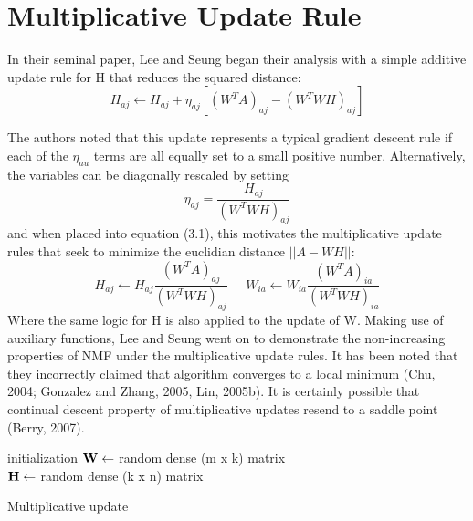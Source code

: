 \documentclass[final,leqno,onefignum,onetabnum]{siamltex1213}
\begin{document}
\section{Multiplicative Update Rule} In their seminal paper, Lee and Seung began their analysis with a simple additive update rule for H that reduces the squared distance: 
\begin{equation}\label{au1}
 H_{aj} \leftarrow  H_{aj} + \eta_{aj} [ (W^T A)_{aj} - (W^T WH)_{aj}]
\end{equation}

The authors noted that this update represents a typical gradient descent rule if each of the $\eta_{au} $ terms are all equally set to a small positive number. Alternatively, the variables can be diagonally rescaled by setting
\begin{equation}\label{et1}
 \eta_{aj} = \frac{ H_{aj} }{(W^T WH)_{aj}}
\end{equation}
and when placed into equation (3.1), this motivates the multiplicative update rules that seek to minimize the euclidian distance $||A - WH ||$:
\begin{equation}\label{au1}
 H_{aj} \leftarrow  H_{aj} \frac{(W^T A)_{aj} }{ (W^T WH)_{aj} } \; \; \; \; \; W_{ia} \leftarrow  W_{ia} \frac{(W^T A)_{ia} }{ (W^T WH)_{ia} }
\end{equation}
Where the same logic for H is also applied to the update of W. Making use of auxiliary functions, Lee and Seung went on to demonstrate the non-increasing properties of NMF under the multiplicative update rules. It has been noted that they incorrectly claimed that algorithm converges to a local minimum (Chu, 2004; Gonzalez and Zhang, 2005, Lin, 2005b). It is certainly possible that continual descent property of multiplicative updates resend to a saddle point (Berry, 2007). \\

\begin{algorithm}[H]

 initialization\;
$\bf{W} \gets $ random dense (m x k) matrix\\
$\bf{H} \gets $ random dense (k x n) matrix\\
 \caption{Multiplicative update}
\end{algorithm} 
\end{document}
